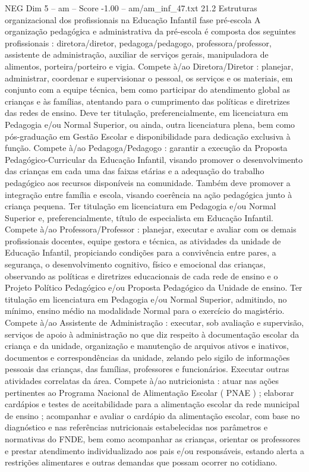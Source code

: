 \begin{textsample}{NEG Dim 5 – am – Score -1.00 – am/am\_inf\_47.txt}  \label{ex:f5_neg_225}
21.2 Estruturas organizacional dos profissionais na Educação Infantil fase pré-escola A organização pedagógica e administrativa da pré-escola é composta dos seguintes profissionais : diretora/diretor, pedagoga/pedagogo, professora/professor, assistente de administração, auxiliar de serviços gerais, manipuladora de alimentos, porteira/porteiro e vigia.
Compete à/ao Diretora/Diretor : planejar, administrar, coordenar e supervisionar o pessoal, os serviços e os materiais, em conjunto com a equipe técnica, bem como participar do atendimento global as crianças e às famílias, atentando para o cumprimento das políticas e diretrizes das redes de ensino.
Deve ter titulação, preferencialmente, em licenciatura em Pedagogia e/ou Normal Superior, ou ainda, outra licenciatura plena, bem como pós-graduação em Gestão Escolar e disponibilidade para dedicação exclusiva à função.
Compete à/ao Pedagoga/Pedagogo : garantir a execução da Proposta Pedagógico-Curricular da Educação Infantil, visando promover o desenvolvimento das crianças em cada uma das faixas etárias e a adequação do trabalho pedagógico aos recursos disponíveis na comunidade.
Também deve promover a integração entre família e escola, visando coerência na ação pedagógica junto à criança pequena.
Ter titulação em licenciatura em Pedagogia e/ou Normal Superior e, preferencialmente, título de especialista em Educação Infantil.
Compete à/ao Professora/Professor : planejar, executar e avaliar com os demais profissionais docentes, equipe gestora e técnica, as atividades da unidade de Educação Infantil, propiciando condições para a convivência entre pares, a segurança, o desenvolvimento cognitivo, físico e emocional das crianças, observando as políticas e diretrizes educacionais de cada rede de ensino e o Projeto Político Pedagógico e/ou Proposta Pedagógico da Unidade de ensino.
Ter titulação em licenciatura em Pedagogia e/ou Normal Superior, admitindo, no mínimo, ensino médio na modalidade Normal para o exercício do magistério.
Compete à/ao Assistente de Administração : executar, sob avaliação e supervisão, serviços de apoio à administração no que diz respeito à documentação escolar da criança e da unidade, organização e manutenção de arquivos ativos e inativos, documentos e correspondências da unidade, zelando pelo sigilo de informações pessoais das crianças, das famílias, professores e funcionários.
Executar outras atividades correlatas da área.
Compete à/ao nutricionista : atuar nas ações pertinentes ao Programa Nacional de Alimentação Escolar ( PNAE ) ; elaborar cardápios e testes de aceitabilidade para a alimentação escolar da rede municipal de ensino ; acompanhar e avaliar o cardápio da alimentação escolar, com base no diagnóstico e nas referências nutricionais estabelecidas nos parâmetros e normativas do FNDE, bem como acompanhar as crianças, orientar os professores e prestar atendimento individualizado aos pais e/ou responsáveis, estando alerta a restrições alimentares e outras demandas que possam ocorrer no cotidiano.

\end{textsample}
